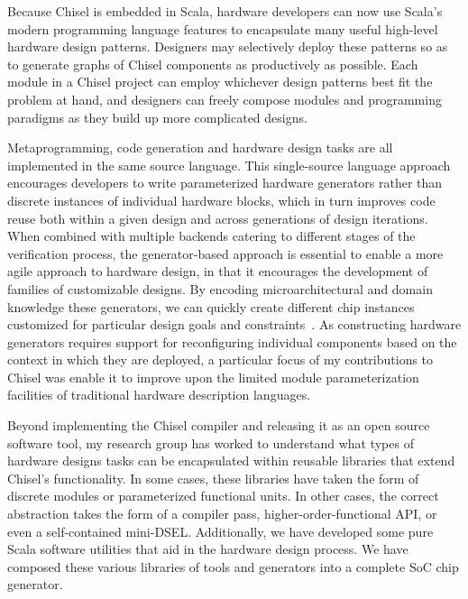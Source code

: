 Because Chisel is embedded in Scala, hardware developers can now use Scala's modern programming language features to encapsulate many useful high-level hardware design patterns.
Designers may selectively deploy these patterns so as to generate graphs of Chisel components as productively as possible.
Each module in a Chisel project can employ whichever design patterns best fit the problem at hand, and designers can freely compose modules and programming paradigms as they build up more complicated designs.

Metaprogramming, code generation and hardware design tasks are all implemented in the same source language.
This single-source language approach encourages developers to write parameterized hardware generators rather than discrete instances of individual hardware blocks,
which in turn improves code reuse both within a given design and across generations of design iterations.
When combined with multiple backends catering to different stages of the verification process, the generator-based approach is essential to enable a more agile approach to hardware design,
in that it encourages the development of families of customizable designs.  
By encoding microarchitectural and domain knowledge these generators, we can quickly create different
chip instances customized for particular design goals and constraints~\cite{shacham-micro10}.  
As constructing hardware generators requires
support for reconfiguring individual components based on the context
in which they are deployed, a particular focus of my contributions to Chisel was enable it to improve
upon the limited module parameterization facilities of traditional
hardware description languages.

Beyond implementing the Chisel compiler and releasing it as an open source software tool, my research group has worked to understand what types of hardware designs tasks can be encapsulated within reusable libraries that extend Chisel's functionality.
In some cases, these libraries have taken the form of discrete modules or parameterized functional units.
In other cases, the correct abstraction takes the form of a compiler pass, higher-order-functional API, or even a self-contained mini-DSEL.
Additionally, we have developed some pure Scala software utilities that aid in the hardware design process.
We have composed these various libraries of tools and generators into a complete SoC chip generator.

